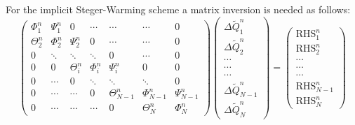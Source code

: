 \documentclass[11pt, a4paper]{article}
\begin{document}
For the implicit Steger-Warming scheme a matrix inversion is needed as follows:
\begin{equation}
    \begin{pmatrix}
        \Phi_1^n & \Psi_1^n & 0 & \cdots & \cdots & \cdots & 0 \\
        \Theta_2^n & \Phi_2^n & \Psi_2^n & 0 & \cdots & \cdots & 0 \\
        0 & \ddots & \ddots & \ddots & 0 & \cdots & 0 \\
        0 & 0 & \Theta_i^n & \Phi_i^n & \Psi_i^n & 0 & 0 \\
        0 & \cdots & 0 & \ddots & \ddots & \ddots & 0 \\
        0 & \cdots & \cdots & 0 & \Theta_{N-1}^n & \Phi_{N-1}^n & \Psi_{N-1}^n \\
        0 & \cdots & \cdots & \cdots & 0 & \Theta_{N}^n & \Phi_{N}^n
    \end{pmatrix}\begin{pmatrix}
        \Delta\tilde{Q}_1^n \\
        \Delta\tilde{Q}_2^n \\
        \cdots \\
        \cdots \\
        \cdots \\
        \Delta\tilde{Q}_{N-1}^n \\
        \Delta\tilde{Q}_N^n 
    \end{pmatrix}=\begin{pmatrix}
        \mathrm{RHS}_1^n \\
        \mathrm{RHS}_2^n\\
        \cdots \\
        \cdots \\
        \cdots \\
        \mathrm{RHS}_{N-1}^n\\
        \mathrm{RHS}_N^n
    \end{pmatrix}
\end{equation}
\end{document}
